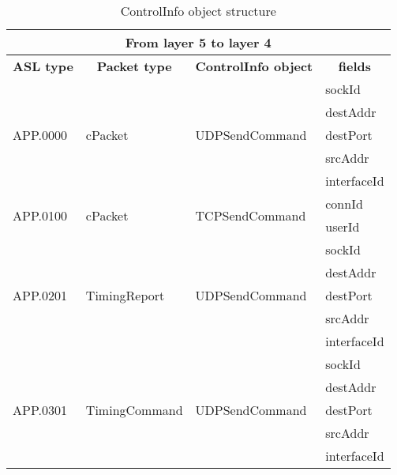 \begin{table}
\centering
\ttfamily
\footnotesize
\caption{ControlInfo object structure}
\label{tab:from4-to5}
\begin{tabular}{|l|l|l|l|}
\hline
\multicolumn{4}{|c|}{\normalfont\textbf{From layer 5 to layer 4}}	\\
\hline
\multicolumn{1}{|c|}{\normalfont\textbf{ASL type}}	&\multicolumn{1}{c|}{\normalfont\textbf{Packet type}}	&\multicolumn{1}{c|}{\normalfont\textbf{ControlInfo object}}		&\multicolumn{1}{c|}{\normalfont\textbf{fields}}\\
\hline
\multirow{5}{*}{APP.0000}	&\multirow{5}{*}{cPacket}		&\multirow{5}{*}{UDPSendCommand}	&sockId			\\
					&						&								&destAddr	\\
					&						&								&destPort	\\
					&						&								&srcAddr	\\
					&						&								&interfaceId	\\
\hline
\multirow{2}{*}{APP.0100}	&\multirow{2}{*}{cPacket}		&\multirow{2}{*}{TCPSendCommand}	&connId			\\
					&						&								&userId	\\
\hline
\multirow{5}{*}{APP.0201}	&\multirow{5}{*}{TimingReport}	&\multirow{5}{*}{UDPSendCommand}	&sockId			\\
					&						&								&destAddr	\\
					&						&								&destPort	\\
					&						&								&srcAddr	\\
					&						&								&interfaceId	\\
\hline
\multirow{5}{*}{APP.0301}	&\multirow{5}{*}{TimingCommand}	&\multirow{5}{*}{UDPSendCommand}	&sockId			\\
					&							&								&destAddr	\\
					&							&								&destPort	\\
					&							&								&srcAddr	\\
					&							&								&interfaceId	\\
\hline
\end{tabular}
\end{table}
%

